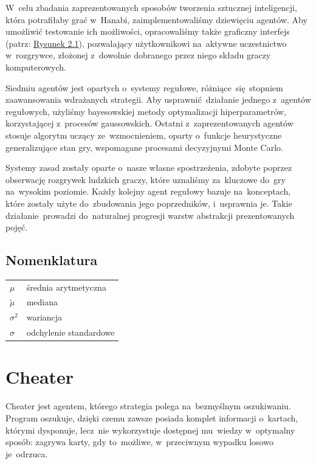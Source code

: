 \documentclass[declaration,shortabstract,inz]{iithesis}
\begin{document}
W~celu zbadania zaprezentowanych sposobów tworzenia sztucznej inteligencji, która potrafiłaby grać w~Hanabi, zaimplementowaliśmy dziewięciu agentów. Aby umożliwić testowanie ich możliwości, opracowaliśmy także graficzny interfejs (patrz: \hyperref[fig:GUI]{Rysunek 2.1}), pozwalający użytkownikowi na~aktywne uczestnictwo w~rozgrywce, złożonej z~dowolnie dobranego przez niego składu graczy komputerowych.

Siedmiu agentów jest opartych o~systemy regułowe, różniące~się stopniem zaawansowania wdrażanych strategii. Aby usprawnić działanie jednego z~agentów regułowych, użyliśmy bayesowskiej metody optymalizacji hiperparametrów, korzystającej z~procesów gaussowskich. Ostatni z~zaprezentowanych agentów stosuje algorytm uczący ze~wzmocnieniem, oparty o~funkcje heurystyczne generalizujące stan gry, wspomagane procesami decyzyjnymi Monte Carlo.

Systemy zasad zostały oparte o~nasze własne spostrzeżenia, zdobyte poprzez obserwację rozgrywek ludzkich graczy, które uznaliśmy za~kluczowe do~gry na~wysokim poziomie. Każdy kolejny agent regułowy bazuje na~konceptach, które zostały użyte do~zbudowania jego poprzedników, i~usprawnia je. Takie działanie~prowadzi do~naturalnej progresji warstw abstrakcji prezentowanych pojęć.

\subsection*{Nomenklatura}

\begin{tabular}{@{}>{$}l<{$}@{ --- }l@{}}
	\mu & średnia arytmetyczna \\
	\tilde{\mu} & mediana \\
	\sigma^2 & wariancja \\
	\sigma & odchylenie standardowe \\
\end{tabular}

\newpage

\section{Cheater}

Cheater jest agentem, którego strategia polega na~bezmyślnym oszukiwaniu. Program oszukuje, dzięki czemu zawsze posiada komplet informacji o~kartach, którymi dysponuje, lecz~nie wykorzystuje dostępnej mu~wiedzy w~optymalny sposób: zagrywa karty, gdy to~możliwe, w~przeciwnym wypadku losowo je~odrzuca.
\end{document}
